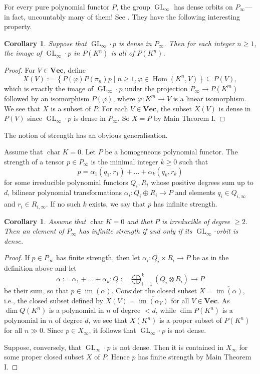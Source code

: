 \documentclass{amsart}
\theoremstyle{plain}
\newtheorem{cor}[thm]{Corollary}
\theoremstyle{definition}
\DeclareMathOperator{\im}{im}
\DeclareMathOperator{\cha}{char}
\renewcommand{\phi}{\varphi}
\DeclareMathOperator{\GL}{GL}
\DeclareMathOperator{\Hom}{Hom}
\renewcommand{\Vec}{\mathbf{Vec}}
\begin{document}
For every pure polynomial functor $P$, the group $\GL_\infty$ has dense orbits on
$P_\infty$---in fact, uncountably many of them! See \cite[\S4.5.1]{B:thesis}. They have
the following interesting property.

\begin{cor}\label{cor:surjective_infty}
Suppose that $\GL_\infty\!\cdot  p$ is dense in $P_\infty$. Then for each integer $n\geq1$, the image of $\GL_\infty\!\cdot p$ in $P(K^n)$ is all of $P(K^n)$.
\end{cor}
\begin{proof}
For $V\in\Vec$, define
\[
X(V):= \left\{P(\phi)P(\pi_n)p\mid n\geq 1, \phi\in\Hom(K^n,V)\right\}\subseteq P(V),
\]
which is exactly the image of $\GL_\infty\!\cdot p$ under the
projection $P_\infty \to P(K^m)$ followed by an isomorphism $P(\phi)$,
where $\phi\colon K^m \to V$ is a linear isomorphism. We see that $X$ is a
subset of $P$. For each $V\in\Vec$, the subset $X(V)$ is dense in $P(V)$ since $\GL_\infty\!\cdot  p$ is dense in $P_\infty$. So $X=P$ by Main Theorem I.
\end{proof}

The notion of strength has an obvious generalisation.

\begin{de}
Assume that $\cha K=0$. Let $P$ be a homogeneous polynomial functor. The strength of
a tensor $p \in P_\infty$ is the minimal integer $k\geq0$ such that
\[
p=\alpha_1(q_1,r_1)+\ldots+\alpha_k(q_k,r_k)
\]
for some irreducible polynomial functors $Q_i,R_i$ whose positive degrees sum up to $d$, bilinear polynomial transformations $\alpha_i\colon Q_i \oplus R_i \to P$ and elements $q_i \in Q_{i,\infty}$ and $r_i \in R_{i,\infty}$. If no such $k$ exists, we say that $p$
has infinite strength.
\end{de}

\begin{cor}
Assume that $\cha K=0$ and that $P$ is irreducible of degree $\geq2$.  Then an element of
$P_\infty$ has infinite strength if and only if its $\GL_\infty$-orbit
is dense.
\end{cor}
\begin{proof}
If $p \in P_\infty$ has finite strength, then let $\alpha_i\colon Q_i \times
R_i \to P$ be as in the definition above and let
\[
\alpha:=\alpha_1 +\ldots + \alpha_k\colon Q:=\bigoplus_{i=1}^k (Q_i \otimes R_i) \to P
\]
be their sum, so that $p \in \im(\alpha)$. Consider the closed subset $X=\overline{\im(\alpha)}$, i.e., the closed subset defined by $X(V)=\overline{\im(\alpha_V)}$ for all $V\in\Vec$. As $\dim Q(K^n)$ is
a polynomial in $n$ of degree $<d$, while $\dim P(K^n)$ is a polynomial
in $n$ of degree $d$, we see that $X(K^n)$ is a proper subset of $P(K^n)$ for all $n\gg0$. Since $p\in X_{\infty}$, it follows that $\GL_\infty\!\cdot p$ is not dense.

Suppose, conversely, that $\GL_\infty\!\cdot p$ is not dense. Then it is
contained in $X_\infty$ for some proper closed subset $X$ of $P$.
Hence $p$ has finite strength by Main Theorem I.
\end{proof}
\end{document}
